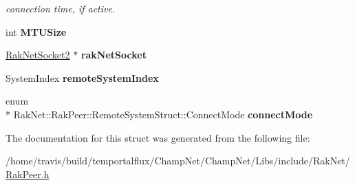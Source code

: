 \begin{DoxyCompactItemize}
\begin{DoxyCompactList}\small\item\em connection time, if active. \end{DoxyCompactList}\item 
\hypertarget{struct_rak_net_1_1_rak_peer_1_1_remote_system_struct_a20573ab2e5fdd17779087f81fc084a56}{int {\bfseries M\-T\-U\-Size}}\label{struct_rak_net_1_1_rak_peer_1_1_remote_system_struct_a20573ab2e5fdd17779087f81fc084a56}

\item 
\hypertarget{struct_rak_net_1_1_rak_peer_1_1_remote_system_struct_a5b3a64f9f425c608738ca013c2b2e843}{\hyperlink{class_rak_net_1_1_rak_net_socket2}{Rak\-Net\-Socket2} $\ast$ {\bfseries rak\-Net\-Socket}}\label{struct_rak_net_1_1_rak_peer_1_1_remote_system_struct_a5b3a64f9f425c608738ca013c2b2e843}

\item 
\hypertarget{struct_rak_net_1_1_rak_peer_1_1_remote_system_struct_ab3ed0a937db76fd623ef53ca705a348b}{System\-Index {\bfseries remote\-System\-Index}}\label{struct_rak_net_1_1_rak_peer_1_1_remote_system_struct_ab3ed0a937db76fd623ef53ca705a348b}

\item 
\hypertarget{struct_rak_net_1_1_rak_peer_1_1_remote_system_struct_a4241eace2b894c5cf90981cecba42784}{enum \\*
Rak\-Net\-::\-Rak\-Peer\-::\-Remote\-System\-Struct\-::\-Connect\-Mode {\bfseries connect\-Mode}}\label{struct_rak_net_1_1_rak_peer_1_1_remote_system_struct_a4241eace2b894c5cf90981cecba42784}

\end{DoxyCompactItemize}


The documentation for this struct was generated from the following file\-:\begin{DoxyCompactItemize}
\item 
/home/travis/build/temportalflux/\-Champ\-Net/\-Champ\-Net/\-Libs/include/\-Rak\-Net/\hyperlink{_rak_peer_8h}{Rak\-Peer.\-h}\end{DoxyCompactItemize}
